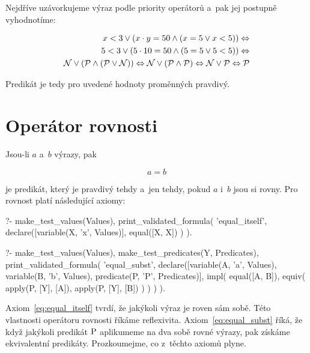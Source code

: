 Nejdříve uzávorkujeme výraz podle priority operátorů a~pak jej postupně vyhodnotíme:

\begin{equation}
\begin{split}
x < 3 \lor (x \cdot y = 50 \land (x = 5 \lor x < 5)) \Leftrightarrow \\
5 < 3 \lor (5 \cdot 10 = 50 \land (5 = 5 \lor 5 < 5)) \Leftrightarrow \\
\mathcal{N} \lor (\mathcal{P} \land (\mathcal{P} \lor \mathcal{N})) \Leftrightarrow \mathcal{N} \lor (\mathcal{P} \land \mathcal{P}) \Leftrightarrow \mathcal{N} \lor \mathcal{P} \Leftrightarrow \mathcal{P} 
\end{split}
\end{equation}

Predikát je tedy pro uvedené hodnoty proměnných pravdivý.


\section{Operátor rovnosti}
\label{sec:equality_operator}

Jsou-li \(a\) a~\(b\) výrazy, pak

\begin{equation}
a = b
\end{equation}

je predikát, který je pravdivý tehdy a~jen tehdy, pokud \(a\) i~\(b\) jsou si rovny. Pro rovnost platí následující axiomy:

\begin{fact}
\begin{prolog}
?- 	make_test_values(Values),
	print_validated_formula(
		'equal_itself',
		declare([variable(X, 'x', Values)],
			equal([X, X])
		)
	).
\end{prolog}
\begin{prolog}
?- 	make_test_values(Values),
	make_test_predicates(Y, Predicates),
	print_validated_formula(
		'equal_subst',
		declare([variable(A, 'a', Values), variable(B, 'b', Values), predicate(P, 'P', Predicates)],
			impl(
				equal([A, B]),
				equiv(
					apply(P, [Y], [A]),
					apply(P, [Y], [B])
				)
			)
		)
	).
\end{prolog}
\end{fact}

Axiom~\eqref{eq:equal_itself} tvrdí, že jakýkoli výraz je roven sám sobě. Této vlastnosti operátoru rovnosti říkáme reflexivita. Axiom~\eqref{eq:equal_subst} říká, že když jakýkoli predikát \(\mathrm{P}\) aplikumeme na dva sobě rovné výrazy, pak získáme ekvivalentní predikáty. Prozkoumejme, co z~těchto axiomů plyne.

